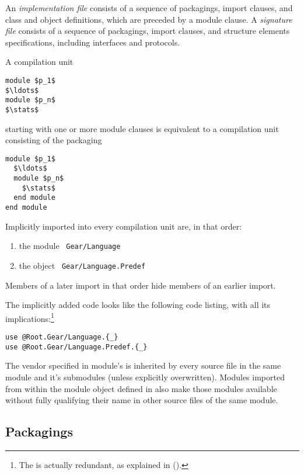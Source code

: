 An {\em implementation file} consists of a sequence of packagings, import clauses, and class and object definitions, which are preceded by a module clause. A {\em signature file} consists of a sequence of packagings, import clauses, and structure elements specifications, including interfaces and protocols. 

A compilation unit 
\begin{lstlisting}
module $p_1$
$\ldots$
module $p_n$
$\stats$
\end{lstlisting}
starting with one or more module clauses is equivalent to a compilation unit consisting of the packaging
\begin{lstlisting}
module $p_1$
  $\ldots$
  module $p_n$
    $\stats$
  end module
end module
\end{lstlisting}

Implicitly imported into every compilation unit are, in that order: 
\begin{enumerate}
\item the module ~\lstinline!Gear/Language! 
\item the object ~\lstinline!Gear/Language.Predef!
\end{enumerate} 
Members of a later import in that order hide members of an earlier import. 


The implicitly added code looks like the following code listing, with all its implications:\footnote{The  is actually redundant, as explained in ().}
\begin{lstlisting}
use @Root.Gear/Language.{_}
use @Root.Gear/Language.Predef.{_}
\end{lstlisting}

The vendor specified in module's  is inherited by every source file in the same module and it's submodules (unless explicitly overwritten). Modules imported from within the module object defined in  also make those modules available without fully qualifying their name in other source files of the same module. 





\subsection{Packagings}

